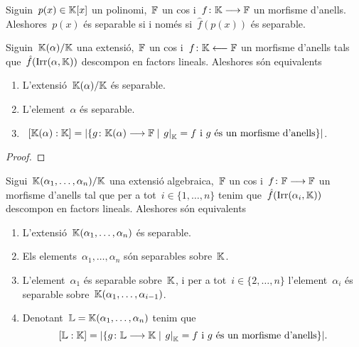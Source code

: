 \documentclass[../../main.tex]{subfiles}
\begin{document}
    \begin{lemma}
        \label{lema:un polinomi és separable si i només si ho és adaptant els coeficients}
        Siguin~\(p(x)\in\mathbb{K}[x]\) un polinomi,~\(\mathbb{F}\) un cos i~\(f\colon\mathbb{K}\longrightarrow\mathbb{F}\) un morfisme d'anells.
        Aleshores~\(p(x)\) és separable si i només si~\(\hat{f}(p(x))\) és separable.
    \end{lemma}
    \begin{lemma}
        \label{lema:condicions pel nombre d'extensions de morfismes}
        Siguin~\(\mathbb{K}(\alpha)/\mathbb{K}\) una extensió,~\(\mathbb{F}\) un cos i~\(f\colon\mathbb{K}\longleftarrow\mathbb{F}\) un morfisme d'anells tals que~\(\hat{f}(\operatorname{Irr}(\alpha,\mathbb{K}))\) descompon en factors lineals.
        Aleshores són equivalents
        \begin{enumerate}
            \item\label{lema:condicions pel nombre d'extensions de morfismes:eq1} L'extensió~\(\mathbb{K}(\alpha)/\mathbb{K}\) és separable.
            \item\label{lema:condicions pel nombre d'extensions de morfismes:eq2} L'element~\(\alpha\) és separable.
            \item\label{lema:condicions pel nombre d'extensions de morfismes:eq3}~\(\grauExtensio{\KK(\alpha)}{\KK}=\card{\{g\colon\KK(\alpha)\longrightarrow\FF\mid\left.g\right|_{\KK}=f\text{ i }g\text{ és un morfisme d'anells}\}}\).
        \end{enumerate}
        \begin{proof}
        \end{proof}
    \end{lemma}
    \begin{theorem}
        \label{thm:Teorema de separabilitat}
        Sigui~\(\mathbb{K}(\alpha_{1},\dots,\alpha_{n})/\mathbb{K}\) una extensió algebraica,~\(\mathbb{F}\) un cos i~\(f\colon\mathbb{F}\longrightarrow\mathbb{F}\) un morfisme d'anells tal que per a tot~\(i\in\{1,\dots,n\}\) tenim que~\(\hat{f}(\operatorname{Irr}(\alpha_{i},\mathbb{K}))\) descompon en factors lineals.
        Aleshores són equivalents
        \begin{enumerate}
            \item L'extensió~\(\mathbb{K}(\alpha_{1},\dots,\alpha_{n})\) és separable.
            \item Els elements~\(\alpha_{1},\dots,\alpha_{n}\) són separables sobre~\(\mathbb{K}\).
            \item L'element~\(\alpha_{1}\) és separable sobre~\(\mathbb{K}\), i per a tot~\(i\in\{2,\dots,n\}\) l'element~\(\alpha_{i}\) és separable sobre~\(\mathbb{K}(\alpha_{1},\dots,\alpha_{i-1})\).
                \item Denotant~\(\mathbb{L}=\mathbb{K}(\alpha_{1},\dots,\alpha_{n})\) tenim que
                \[
                    \grauExtensio{\LL}{\KK}=\card{\{g\colon\LL\longrightarrow\KK\mid\left.g\right|_{\KK}=f\text{ i }g\text{ és un morfisme d'anells}\}}.
                \]
        \end{enumerate}
    \end{theorem}
\end{document}
